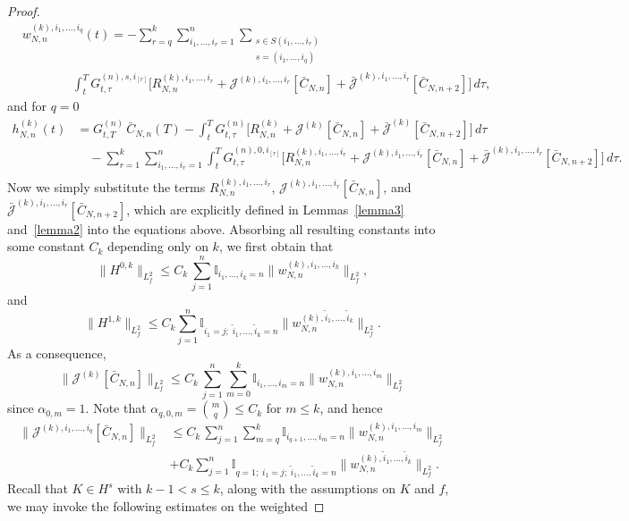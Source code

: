 \documentclass[pdflatex,sn-mathphys-num]{sn-jnl}
\theoremstyle{thmstyleone}%
\theoremstyle{thmstyletwo}%
\theoremstyle{thmstylethree}%
\begin{document}
\begin{proof}
\[\begin{aligned}
&w^{(k),i_1,\dots,i_q}_{N,n}(t)= -\sum_{r=q}^{k}
\sum_{i_{1},\dots,i_r=1}^{n}
\sum_{\substack{s\in S(i_1,\dots,i_r)\\ s=(i_1,\ldots,i_q)}}
\\ & \qquad \qquad
\int_t^T
G_{t,\tau}^{(n),s,i_{[r]}}
\Bigg[R^{(k),i_1,...,i_r}_{N,n}+
\mathcal J^{(k),i_1,\dots,i_r}[\bar C_{N,n}]+
\bar{\mathcal J}^{(k),i_1,\dots,i_r}[\bar C_{N,n+2}]
\Bigg]
\,d\tau,
\end{aligned}
\]
and for $q=0$
\[
\begin{aligned}
h^{(k)}_{N,n}(t)
&=
G^{(n)}_{t,T}\,\bar{C}_{N,n}(T)
-
\int_t^T
G_{t,\tau}^{(n)}
\Bigg[
R^{(k)}_{N,n}+\mathcal{J}^{(k)}[\bar{C}_{N,n}] + \bar{\mathcal{J}}^{(k)}[\bar{C}_{N,n+2}]
\Bigg]\,
d\tau
\\[0.8em]
&\quad
-
\sum_{r=1}^k
\sum_{i_{1},\dots,i_r=1}^n
\int_t^T
G_{t,\tau}^{(n),0,i_{[r]}}
\Bigg[
R^{(k),i_1,...,i_r}_{N,n}
+ \mathcal J^{(k),i_1,\dots,i_r}[\bar C_{N,n}]+
\bar{\mathcal J}^{(k),i_1,\dots,i_r}[\bar C_{N,n+2}]
\Bigg]
\,d\tau. \\
\end{aligned}
\]
Now we simply substitute the terms $R_{N,n}^{(k),i_1,...,i_r}$, $\mathcal{J}^{(k),i_1,...,i_r}[\bar{C}_{N,n}]$, and $\bar{\mathcal{J}}^{(k),i_1,...,i_r}[\bar{C}_{N,n+2}]$, which are explicitly defined in Lemmas~\ref{lemma3} and~\ref{lemma2} into the equations above.
Absorbing all resulting constants into some constant $C_k$ depending only on $k$, we first obtain that
\[
\|H^{0,k}\|_{L^2_f}\leq C_k\,\sum_{j=1}^n \mathbb{I}_{i_1,\ldots, i_k=n}\|
w^{(k),i_1,\ldots,i_k}_{N,n}\|_{L^2_f},
\]
and
\[
\| H^{1,k}\|_{L^2_f} \leq C_k \sum_{j=1}^n \mathbb{I}_{i_1=j;\;\tilde i_1,\ldots,\tilde i_k=n}\|
w^{(k),\tilde i_1,\ldots,\tilde i_k}_{N,n}\|_{L^2_f}.\]
As a consequence,
\[
\|\mathcal{J}^{(k)}[\bar{C}_{N,n}]\|_{L^2_f}\leq C_k\,\sum_{j=1}^n \sum_{m=0}^k \mathbb{I}_{i_1,\ldots,i_m=n}\|
w^{(k),i_1,\ldots,i_m}_{N,n}\|_{L^2_f}
\]
since $\alpha_{0,m}=1$. Note that $\alpha_{q,0,m}=\binom{m}{q}\leq C_k$ for $m\leq k$, and hence
\[
\begin{split}
\|\mathcal{J}^{(k),i_1,...,i_q}[\bar{C}_{N,n}]\|_{L^2_f}&\leq C_k\,\sum_{j=1}^n \sum_{m=q}^k \mathbb{I}_{i_{q+1},\ldots,i_m=n}\|
w^{(k),i_1,\ldots,i_m}_{N,n}\|_{L^2_f}\\
&+C_k \sum_{j=1}^n \mathbb{I}_{q=1;\;i_1=j;\;\tilde i_1,\ldots,\tilde i_k=n}\|
w^{(k),\tilde i_1,\ldots,\tilde i_k}_{N,n}\|_{L^2_f}.
\end{split}
\]
Recall that $K\in H^s$ with $k-1<s\leq k$, along with the assumptions on $K$ and $f$, we may invoke the following estimates on the weighted

\end{proof}
\end{document}
